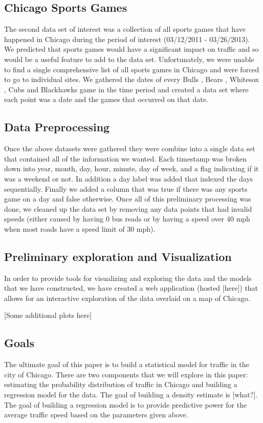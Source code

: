 \documentclass[12pt]{article}
\begin{document}
\begin{multicols*}{2}
\subsection{Chicago Sports Games}
The second data set of interest was a collection of all sports games that have happened in Chicago during the period of interest (03/12/2011 - 03/26/2013). We predicted that sports games would have a significant impact on traffic and so would be a useful feature to add to the data set. Unfortunately, we were unable to find a single comprehensive list of all sports games in Chicago and were forced to go to individual sites. We gathered the dates of every Bulls \cite{bullsdata}, Bears \cite{bearsdata}, Whitesox \cite{whitesoxdata}, Cubs \cite{cubsdata} and Blackhawks \cite{blackhawksdata} game in the time period and created a data set where each point was a date and the games that occurred on that date.
\subsection{Data Preprocessing}
Once the above datasets were gathered they were combine into a single data set that contained all of the information we wanted. Each timestamp was broken down into year, month, day, hour, minute, day of week, and a flag indicating if it was a weekend or not. In addition a day label was added that indexed the days sequentially. Finally we added a column that was true if there was any sports game on a day and false otherwise. Once all of this preliminary processing was done, we cleaned up the data set by removing any data points that had invalid speeds (either caused by having 0 bus reads or by having a speed over 40 mph when most roads have a speed limit of 30 mph). 
\subsection{Preliminary exploration and Visualization}
In order to provide tools for visualizing and exploring the data and the models that we have constructed, we have created a web application (hosted [here]) that allows for an interactive exploration of the data overlaid on a map of Chicago.

[Some additional plots here]
\subsection{Goals}
The ultimate goal of this paper is to build a statistical model for traffic in the city of Chicago. There are two components that we will explore in this paper: estimating the probability distribution of traffic in Chicago and building a regression model for the data. The goal of building a density estimate is [what?]. The goal of building a regression model is to provide predictive power for the average traffic speed based on the parameters given above.

\end{multicols*}
\end{document}
